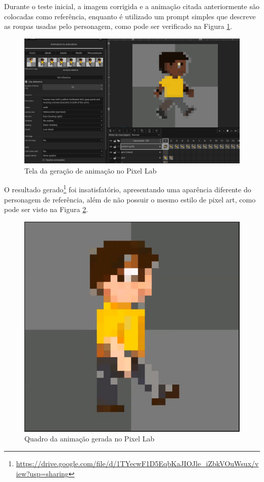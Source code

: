 Durante o teste inicial, a imagem corrigida e a animação citada anteriormente são colocadas como referência, enquanto é utilizado um prompt simples que descreve as roupas usadas pelo personagem, como pode ser verificado na Figura \ref{fig:pixelLabAniTela}.


\begin{figure}[htbp]
    \centering
    \caption{\small Tela da geração de animação no Pixel Lab}
    \label{fig:pixelLabAniTela}
    \includegraphics[width=1\linewidth]{figs/pixelLab/dia3/tela_animacao.PNG}
\end{figure}

O resultado gerado\footnote{\url{https://drive.google.com/file/d/1TYecwF1D5EqbKaJIOJle_iZbkVOuWsux/view?usp=sharing}} foi insatisfatório, apresentando uma aparência diferente do personagem de referência, além de não possuir o mesmo estilo de pixel art, como pode ser visto na Figura \ref{fig:pixelLabAniResRuim}.

\begin{figure}[htbp]
    \centering
    \caption{\small Quadro da animação gerada no Pixel Lab}
    \label{fig:pixelLabAniResRuim}
    \includegraphics[width=0.4\linewidth]{figs/pixelLab/dia3/print1.PNG}
\end{figure}

